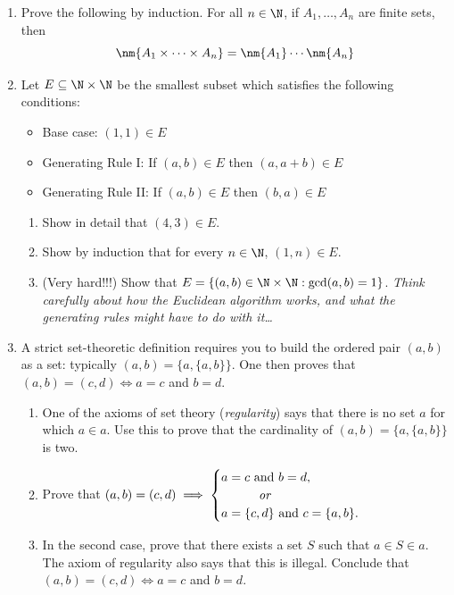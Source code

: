 \begin{enumerate}
  \item Prove the following by induction. For all $n\in\N$, if $A_1,\ldots,A_n$ are finite sets, then
  \[\nm{A_1\times\cdots\times A_n}=\nm{A_1}\cdots\nm{A_n}\] 
	
	\item Let $E\subseteq\N\times\N$ be the smallest subset which satisfies the following conditions:
	\begin{itemize}
		\item Base case: $(1,1)\in E$
		\item Generating Rule I: If $(a,b)\in E$ then $(a,a+b)\in E$
		\item Generating Rule II: If $(a,b)\in E$ then $(b,a)\in E$
	\end{itemize}

	\begin{enumerate}
		\item Show in detail that $(4,3)\in E$.
		\item Show by induction that for every $n\in\N$, $(1,n)\in E$.
		\item (Very hard!!!) Show that $E=\{(a,b)\in\N\times\N:\gcd(a,b)=1\}$. \emph{Think carefully about how the Euclidean algorithm works, and what the generating rules might have to do with it\ldots}
	\end{enumerate}
	
	\item A strict set-theoretic definition requires you to build the ordered pair $(a,b)$ as a set: typically $(a,b)=\{a,\{a,b\}\}$. One then proves that $(a,b)=(c,d)\iff a=c$ and $b=d$.
	\begin{enumerate}
	  \item One of the axioms of set theory (\emph{regularity}) says that there is no set $a$ for which $a\in a$. Use this to prove that the cardinality of $(a,b)=\{a,\{a,b\}\}$ is two.
	  \item Prove that $(a,b)=(c,d)\implies\begin{cases}
	  a=c\text{ and }b=d,\\
	  \qquad\quad\text{\emph{or}}\\
	  a=\{c,d\}\text{ and }c=\{a,b\}.
	  \end{cases}$
	  \item In the second case, prove that there exists a set $S$ such that $a\in S\in a$. The axiom of regularity also says that this is illegal. Conclude that $(a,b)=(c,d)\iff a=c$ and $b=d$.
	\end{enumerate}
	

\end{enumerate}
